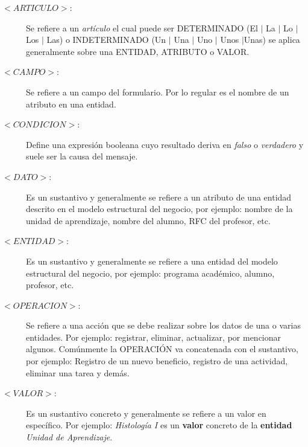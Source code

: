 \begin{description}
	\item [$<ARTICULO>$:] Se refiere a un {\em artículo} el cual puede ser DETERMINADO (El $\mid$ La $\mid$ Lo $\mid$ Los $\mid$ Las) o INDETERMINADO (Un $\mid$ Una $\mid$ 
	Uno $\mid$ Unos $\mid$Unas) se aplica generalmente sobre una ENTIDAD, ATRIBUTO o VALOR.
	
	\item [$<CAMPO>$:] Se refiere a un campo del formulario. Por lo regular es el nombre de un atributo en una entidad.
	
	\item [$<CONDICION>$:] Define una expresión booleana cuyo resultado deriva en {\em falso} o {\em verdadero} y suele ser la causa del mensaje.
	
	\item [$<DATO>$:] Es un sustantivo y generalmente se refiere a un atributo de una entidad descrito en el modelo estructural del negocio, por ejemplo: nombre de la unidad de aprendizaje, nombre del alumno, RFC del profesor, etc. %
	
	\item [$<ENTIDAD>$:] Es un sustantivo y generalmente se refiere a una entidad del modelo estructural del negocio, por ejemplo: programa académico, alumno, profesor, etc.
	\item [$<OPERACION>$:] Se refiere a una acción que se debe realizar sobre los datos de una o varias entidades. Por ejemplo: registrar, eliminar, actualizar, por mencionar algunos. Comúnmente la OPERACIÓN va concatenada con el sustantivo, por ejemplo: Registro de un nuevo beneficio, registro de una actividad, eliminar una tarea y demás.
	
	\item [$<VALOR>$:] Es un sustantivo concreto y generalmente se refiere a un valor en específico. Por ejemplo: \textit{Histología I} es un \textbf{valor} concreto de la \textbf{entidad} \textit{Unidad de Aprendizaje}.
	
\end{description}

